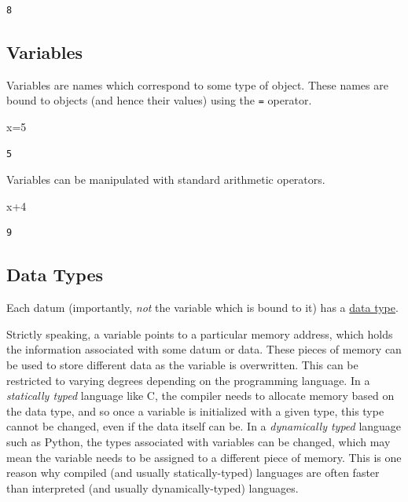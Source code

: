\documentclass[
  11pt,
]{book}
\newenvironment{Shaded}{\begin{snugshade}}{\end{snugshade}}
\newcommand{\FloatTok}[1]{\textcolor[rgb]{0.06,0.06,0.06}{#1}}
\newcommand{\NormalTok}[1]{#1}
\begin{document}
\begin{verbatim}
8
\end{verbatim}

\hypertarget{variables}{%
\subsection{Variables}\label{variables}}

Variables are names which correspond to some type of object. These names are bound to objects (and hence their values) using the \texttt{=} operator.

\begin{Shaded}
\begin{Highlighting}[]
\NormalTok{x=}\FloatTok{5}
\end{Highlighting}
\end{Shaded}

\begin{verbatim}
5
\end{verbatim}

Variables can be manipulated with standard arithmetic operators.

\begin{Shaded}
\begin{Highlighting}[]
\NormalTok{x+}\FloatTok{4}
\end{Highlighting}
\end{Shaded}

\begin{verbatim}
9
\end{verbatim}

\hypertarget{data-types}{%
\subsection{Data Types}\label{data-types}}

Each datum (importantly, \emph{not} the variable which is bound to it) has a \href{https://docs.julialang.org/en/v1/manual/types/}{data type}.

\begin{center}

\begin{info}
Strictly speaking, a variable points to a particular memory address, which holds the information associated with some datum or data. These pieces of memory can be used to store different data as the variable is overwritten. This can be restricted to varying degrees depending on the programming language. In a \emph{statically typed} language like C, the compiler needs to allocate memory based on the data type, and so once a variable is initialized with a given type, this type cannot be changed, even if the data itself can be. In a \emph{dynamically typed} language such as Python, the types associated with variables can be changed, which may mean the variable needs to be assigned to a different piece of memory. This is one reason why compiled (and usually statically-typed) languages are often faster than interpreted (and usually dynamically-typed) languages.

\end{info}


\end{center}
\end{document}
